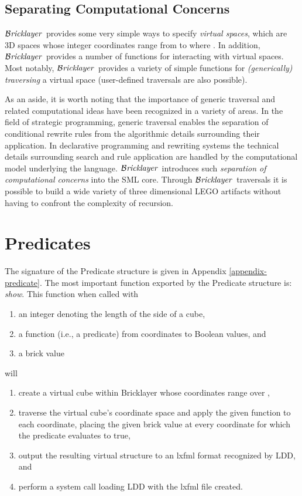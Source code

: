 \documentclass[submission,copyright,creativecommons]{eptcs}
\newcommand{\bricklayer}{\ensuremath{\mathcal{B}\emph{ricklayer}}}
\begin{document}
\subsection{Separating Computational Concerns}


\bricklayer\ provides some very simple ways to specify \emph{virtual spaces}, which are 3D spaces whose integer coordinates range from  to  where . In addition, \bricklayer\ provides a number of functions for interacting with virtual spaces. Most notably, \bricklayer\ provides a variety of simple functions for \emph{(generically) traversing} a virtual space (user-defined traversals are also possible).


As an aside, it is worth noting that the importance of generic traversal and related computational ideas have been recognized in a variety of areas. In the field of strategic programming, generic traversal enables the separation of conditional rewrite rules from the algorithmic details surrounding their application. In declarative programming and rewriting systems the technical details surrounding search and rule application are handled by the computational model underlying the language. \bricklayer\ introduces such \emph{separation of computational concerns} into the SML core. Through \bricklayer\ traversals it is possible to build a wide variety of three dimensional LEGO artifacts without having to confront the complexity of recursion.



\section{Predicates}\label{section-predicates}


The signature of the Predicate structure is given in Appendix \ref{appendix-predicate}. The most important function exported by the Predicate structure is: \emph{show}. This function when called with

\begin{enumerate}
\item an integer  denoting the length of the side of a cube,
\item a function (i.e., a predicate) from  coordinates to Boolean values, and
\item a brick value
\end{enumerate}

\noindent will
\begin{enumerate}
\item create a virtual cube within Bricklayer whose coordinates range over ,
\item traverse the virtual cube's coordinate space and apply the given function to each coordinate, placing the given brick value at every coordinate for which the predicate evaluates to true,
\item output the resulting virtual structure to an lxfml format recognized by LDD, and
\item perform a system call loading LDD with the lxfml file created.
\end{enumerate}
\end{document}
